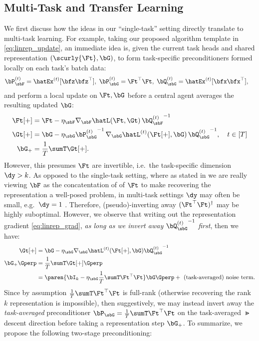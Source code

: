 \subsection{Multi-Task and Transfer Learning}\label{sec:extension_multi_task}

We first discuss how the ideas in our ``single-task'' setting directly translate to multi-task learning. For example, taking our proposed algorithm template in \eqref{eq:linrep_update}, an immediate idea is, given the current task heads and shared representation $(\scurly{\Ft}, \bG)$, to form task-specific preconditioners formed locally on each task's batch data:
\begin{align*}
    \bP_\sbF^{(t)} &= \hatEx^{(t)}[\bfz \bfz^\top],\; \bP_\sbG^{(t)} = \Ft^\top \Ft, \; \bQ_\sbG^{(t)} = \hatEx^{(t)}[\bfx \bfx^\top],
\end{align*}
and perform a local update on $\Ft, \bG$ before a central agent averages the resulting updated $\bG$:
\begin{align*}
    \Ft[+] &= \Ft - \eta_\sbF \nabla_\sbF \hatL(\Ft, \Gt)\, {\bQ^{(t)}_{\sbF}}^{-1}\\
    \Gt[+] &= \bG - \eta_{\sbG} {\bP^{(t)}_\sbG}^{-1}\, \nabla_{\sbG} \hatL^{(t)}(\Ft[+], \bG)\, {\bQ^{(t)}_\sbG}^{-1}, \quad t \in [T] \\
    \bG_+ &= \frac{1}{T}\sumT \Gt[+].
\end{align*}
However, this presumes $\Ft$ are invertible, i.e.\ the task-specific dimension $\dy > k$. As opposed to the single-task setting, where as stated in  we are really viewing $\bF$ as the concatentation of of $\Ft$ to make recovering the representation a well-posed problem, in multi-task settings $\dy$ may often be small, e.g.\ $\dy = 1$ \cite{tripuraneni2021provable, du2020few, collins2021exploiting, thekumparampil2021sample}. Therefore, (pseudo)-inverting away $(\Ft^\top \Ft)^{\dagger}$ may be highly suboptimal. However, we observe that writing out the representation gradient \eqref{eq:linrep_grad}, \emph{as long as we invert away ${\bQ^{(t)}_\sbG}^{-1}$ first}, then we have:
\begin{align*}
    \Gt[+] &= \bG - \eta_{\sbG} \nabla_{\sbG} \hatL^{(t)}(\Ft[+], \bG){\bQ^{(t)}_\sbG}^{-1} \\
    \bG_+ \Gperp &= \frac{1}{T}\sumT \Gt[+] \Gperp \\
    &= \paren{\bI_k - \eta_\sbG \frac{1}{T}\sumT \Ft^\top \Ft} \bG \Gperp + \text{ (task-averaged) noise term}.
\end{align*}
Since by assumption $\frac{1}{T}\sumT \Ft^\top \Ft$ is full-rank (otherwise recovering the rank $k$ representation is impossible), then suggestively, we may instead invert away the \textit{task-averaged} preconditioner $\bP_{\sbG} = \frac{1}{T}\sumT \Ft^\top \Ft$ on the task-averaged $\Gt$ descent direction before taking a representation step $\bG_+$. To summarize, we propose the following two-stage preconditioning:
